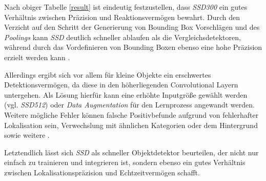 Nach obiger Tabelle \ref{result} ist eindeutig festzustellen, dass \textit{SSD300} ein gutes Verhältnis zwischen Präzision und Reaktionsvermögen bewahrt. Durch den Verzicht auf den Schritt der Generierung von Bounding Box Vorschlägen und des \textit{Poolings} kann \textit{SSD} deutlich schneller ablaufen als die Vergleichsdetektoren, während durch das Vordefinieren von Bounding Boxen ebenso eine hohe Präzision erzielt werden kann \cite{ssd.20161229}.

Allerdings ergibt sich vor allem für kleine Objekte ein erschwertes Detektionsvermögen, da diese in den höherliegenden Convolutional Layern untergehen. Als Lösung hierfür kann eine erhöhte Inputgröße gewählt werden (vgl. \textit{SSD512}) oder \textit{Data Augmentation} für den Lernprozess angewandt werden. Weitere mögliche Fehler können falsche Positivbefunde aufgrund von fehlerhafter Lokalisation sein, Verwechslung mit ähnlichen Kategorien oder dem Hintergrund sowie weitere \cite{ssd.20161229}.

Letztendlich lässt sich \textit{SSD} als schneller Objektdetektor beurteilen, der nicht nur einfach zu trainieren und integrieren ist, sondern ebenso ein gutes Verhältnis zwischen Lokalisationspräzision und Echtzeitvermögen schafft.
